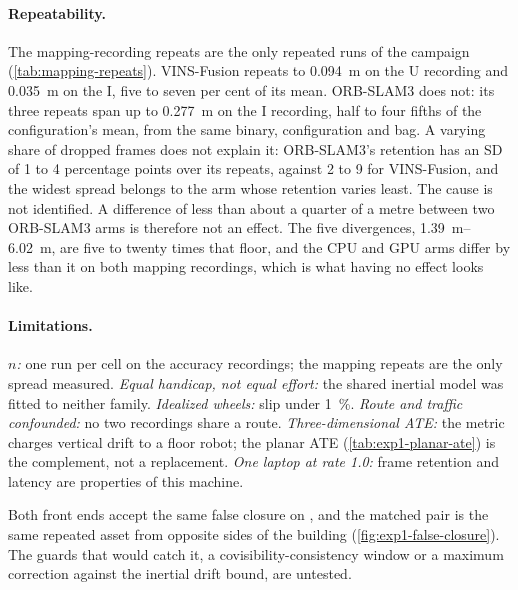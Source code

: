 \documentclass[11pt,a4paper,notitlepage]{report}
\begin{document}


\paragraph{Repeatability.} The mapping-recording repeats are the only repeated
runs of the campaign (\cref{tab:mapping-repeats}). VINS-Fusion repeats to
\SI{0.094}{\metre} on the U recording and \SI{0.035}{\metre} on the I, five
to seven per cent of its mean. ORB-SLAM3 does not: its three repeats span up
to \SI{0.277}{\metre} on the I recording, half to four fifths of the
configuration's mean, from the same binary, configuration and bag. A varying
share of dropped frames does not explain it: ORB-SLAM3's retention has an SD
of 1 to 4 percentage points over its repeats, against 2 to 9 for VINS-Fusion,
and the widest spread belongs to the arm whose retention varies least. The
cause is not identified. A difference of less than about a quarter
of a metre between two ORB-SLAM3 arms is therefore not an effect. The five
divergences, \SIrange{1.39}{6.02}{\metre}, are five to twenty times that
floor, and the CPU and GPU arms differ by less than it on both mapping recordings,
which is what having no effect looks like.


\paragraph{Limitations.} \emph{$n$:} one run per cell on the accuracy
recordings; the mapping repeats are the only spread measured.
\emph{Equal handicap, not equal effort:} the shared inertial model was fitted
to neither family. \emph{Idealized wheels:} slip under \SI{1}{\percent}.
\emph{Route and traffic confounded:} no two recordings share a route.
\emph{Three-dimensional ATE:} the metric charges vertical drift to a floor
robot; the planar ATE (\cref{tab:exp1-planar-ate}) is the complement, not a
replacement. \emph{One laptop at rate 1.0:} frame retention and latency are
properties of this machine.

\begin{queried}
Both front ends accept the same false closure on , and the
matched pair is the same repeated asset from opposite sides of the building
(\cref{fig:exp1-false-closure}). The guards that would catch it, a
covisibility-consistency window or a maximum correction against the inertial
drift bound, are untested.
\end{queried}
\end{document}
